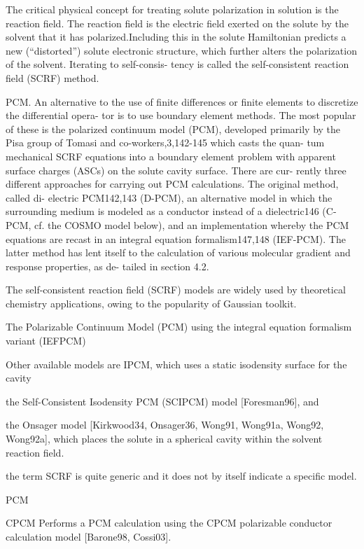 The critical physical concept for treating solute polarization in
solution is the reaction field. The reaction field is the electric
field exerted on the solute by the solvent that it has polarized.Including
this in the solute Hamiltonian predicts a new (“distorted”) solute
electronic structure, which further alters the polarization of the
solvent. Iterating to self-consis- tency is called the self-consistent
reaction field (SCRF) method. \citep{Cramer_1999_implicit_model}

PCM. An alternative to the use of finite differences or finite elements
to discretize the differential opera- tor is to use boundary element
methods. The most popular of these is the polarized continuum model
(PCM), developed primarily by the Pisa group of Tomasi and co-workers,3,142-145
which casts the quan- tum mechanical SCRF equations into a boundary
element problem with apparent surface charges (ASCs) on the solute
cavity surface. There are cur- rently three different approaches for
carrying out PCM calculations. The original method, called di- electric
PCM142,143 (D-PCM), an alternative model in which the surrounding
medium is modeled as a conductor instead of a dielectric146 (C-PCM,
cf. the COSMO model below), and an implementation whereby the PCM
equations are recast in an integral equation formalism147,148 (IEF-PCM).
The latter method has lent itself to the calculation of various molecular
gradient and response properties, as de- tailed in section 4.2.

The self-consistent reaction field (SCRF) models \citep{Jensen,scrf}
are widely used by theoretical chemistry applications, owing to the
popularity of Gaussian toolkit. 

The Polarizable Continuum Model (PCM) using the integral equation
formalism variant (IEFPCM) 

Other available models are IPCM, which uses a static isodensity surface
for the cavity

the Self-Consistent Isodensity PCM (SCIPCM) model {[}Foresman96{]},
and 

the Onsager model {[}Kirkwood34, Onsager36, Wong91, Wong91a, Wong92,
Wong92a{]}, which places the solute in a spherical cavity within the
solvent reaction field.

the term SCRF is quite generic and it does not by itself indicate
a specific model.

PCM

CPCM Performs a PCM calculation using the CPCM polarizable conductor
calculation model {[}Barone98, Cossi03{]}.

